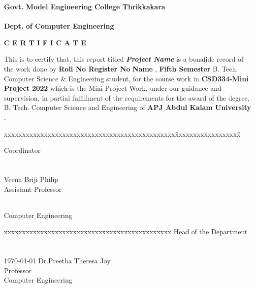 \documentclass[11pt]{report}
\begin{document}
\begin{titlepage}
\begin{center}
\Large{\textbf{Govt. Model Engineering College Thrikkakara}}\\
\Large{\textbf{\\Dept. of Computer Engineering}}\\
\end{center}
\begin{figure}[h]
\begin{center}
\end{center}
\end{figure}
\begin{center}
\Large{\textbf{C E R T I F I C A T E}}\\
\vspace{.1in}
\end{center}
This is to certify that, this report titled \textbf{\textit {Project Name}} is a bonafide record of the work done by
{\textbf{Roll No
Register No
}{\textbf{Name}}} {{, \textbf{Fifth Semester} B. Tech. Computer Science \& Engineering }}
student,  for the course work in \textbf{CSD334-Mini Project 2022} which is the Mini Project Work, under our guidance and supervision, in partial 
 fulfillment of the requirements for the award of the degree, B. Tech. Computer 
Science  and Engineering of \textbf{APJ Abdul Kalam University }.
\vspace{.1in}
\begin{tabbing}
xxxxxxxxxxxxxxxxxxxxxxxxxxxxxxxxxxxxxxxxxxxxxxx\= xxxxxxxxxxxxxxxxxx\= \kill

			\>				Coordinator
\\
\\
\\
  \>Veena Briji Philip\\
	\>Assistant Professor
	
	 \\
	\>	Computer Engineering
\end{tabbing}
\vspace{.08in}
%
\begin{tabbing}
xxxxxxxxxxxxxxxxxxxxxxxxxxxx\= xxxxxxxxxxxxxxxxxx\= \kill
			\>Head of the Department \\
\\
\\
\today
\>Dr.Preetha Theresa Joy\\
\>Professor\\
\>Computer Engineering\\
\end{tabbing}
\end{titlepage}
\end{document}
